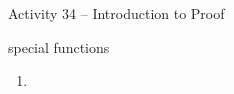 \documentclass{amsart}
\begin{document}
\thispagestyle{empty}

\centerline{\Large Activity 34 -- Introduction to Proof}
\centerline{\large special functions}

\bigskip
\Large


\begin{enumerate}
	
\item 

\end{enumerate}
\end{document}
